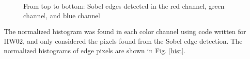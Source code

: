\documentclass{article}[12 pt]
\begin{document}
\begin{figure}[H]
\captionsetup[subfloat]{labelformat=empty}
\centering
{} \\
 \\
\caption{From top to bottom: Sobel edges detected in the red channel, green channel, and blue channel}
\label{edges}
\end{figure}

\noindent
The normalized histogram was found in each color channel using code written for HW02, and only considered the pixels found from the Sobel edge detection.  The normalized histograms of edge pixels are shown in Fig. \ref{hist}.
\end{document}
